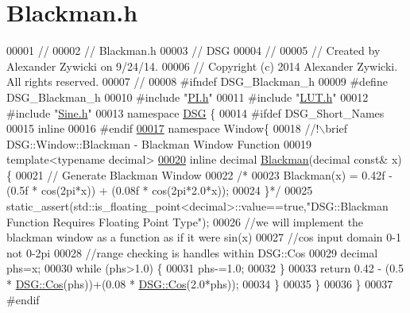 \hypertarget{_blackman_8h_source}{\section{Blackman.\+h}
\label{_blackman_8h_source}
}

\begin{DoxyCode}
00001     \textcolor{comment}{//}
00002 \textcolor{comment}{//  Blackman.h}
00003 \textcolor{comment}{//  DSG}
00004 \textcolor{comment}{//}
00005 \textcolor{comment}{//  Created by Alexander Zywicki on 9/24/14.}
00006 \textcolor{comment}{//  Copyright (c) 2014 Alexander Zywicki. All rights reserved.}
00007 \textcolor{comment}{//}
00008 \textcolor{preprocessor}{#ifndef DSG\_Blackman\_h}
00009 \textcolor{preprocessor}{#define DSG\_Blackman\_h}
00010 \textcolor{preprocessor}{#include "\hyperlink{_p_i_8h}{PI.h}"}
00011 \textcolor{preprocessor}{#include "\hyperlink{_l_u_t_8h}{LUT.h}"}
00012 \textcolor{preprocessor}{#include "\hyperlink{_sine_8h}{Sine.h}"}
00013 \textcolor{keyword}{namespace }\hyperlink{namespace_d_s_g}{DSG} \{
00014 \textcolor{preprocessor}{#ifdef DSG\_Short\_Names}
00015     \textcolor{keyword}{inline}
00016 \textcolor{preprocessor}{#endif}
\hypertarget{_blackman_8h_source_l00017}{}\hyperlink{namespace_d_s_g_1_1_window}{00017}     \textcolor{keyword}{namespace }Window\{\textcolor{comment}{}
00018 \textcolor{comment}{        //!\(\backslash\)brief DSG::Window::Blackman - Blackman Window Function}
00019 \textcolor{comment}{}        \textcolor{keyword}{template}<\textcolor{keyword}{typename} decimal>
\hypertarget{_blackman_8h_source_l00020}{}\hyperlink{namespace_d_s_g_1_1_window_a0800636ec7008aa75ff987feef5aafdf}{00020}         \textcolor{keyword}{inline} decimal \hyperlink{namespace_d_s_g_1_1_window_a0800636ec7008aa75ff987feef5aafdf}{Blackman}(decimal \textcolor{keyword}{const}& x)\{
00021             \textcolor{comment}{// Generate Blackman Window}
00022             \textcolor{comment}{/*}
00023 \textcolor{comment}{             Blackman(x) = 0.42f - (0.5f * cos(2pi*x)) + (0.08f * cos(2pi*2.0*x));}
00024 \textcolor{comment}{             \}*/}
00025             static\_assert(std::is\_floating\_point<decimal>::value==\textcolor{keyword}{true},\textcolor{stringliteral}{"DSG::Blackman Function Requires
       Floating Point Type"});
00026             \textcolor{comment}{//we will implement the blackman window as a function as if it were sin(x)}
00027             \textcolor{comment}{//cos input domain 0-1 not 0-2pi}
00028             \textcolor{comment}{//range checking is handles within DSG::Cos}
00029             decimal phs=x;
00030             \textcolor{keywordflow}{while} (phs>1.0) \{
00031                 phs-=1.0;
00032             \}
00033             \textcolor{keywordflow}{return} 0.42 - (0.5 * \hyperlink{namespace_d_s_g_ade303ad15c77f534429305c3cbd90191}{DSG::Cos}(phs))+(0.08 * \hyperlink{namespace_d_s_g_ade303ad15c77f534429305c3cbd90191}{DSG::Cos}(2.0*phs));
00034         \}
00035     \}
00036 \}
00037 \textcolor{preprocessor}{#endif}
\end{DoxyCode}
